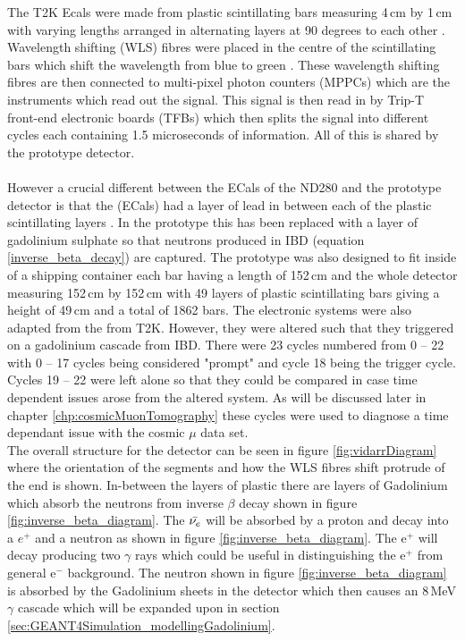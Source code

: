 The T2K Ecals were made from plastic scintillating bars measuring 4\,cm by 1\,cm with varying lengths arranged in alternating layers at 90 degrees to each other \cite{Allan_2013}. Wavelength shifting (WLS) fibres were placed in the centre of the scintillating bars which shift the wavelength from blue to green \cite{Allan_2013}. These wavelength shifting fibres are then connected to multi-pixel photon counters (MPPCs) which are the instruments which read out the signal. This signal is then read in by Trip-T front-end electronic boards (TFBs) which then splits the signal into different cycles each containing 1.5 microseconds of information. All of this is shared by the prototype detector. 
\\\\However a crucial different between the ECals of the ND280 and the prototype detector is that the (ECals) had a layer of lead in between each of the plastic scintillating layers \cite{Allan_2013}. In the prototype this has been replaced with a layer of gadolinium sulphate so that neutrons produced in IBD (equation \ref{inverse_beta_decay}) are captured. The prototype was also designed to fit inside of a shipping container each bar having a length of 152\,cm and the whole detector measuring 152\,cm by 152\,cm with 49 layers of plastic scintillating bars giving a height of 49\,cm and a total of 1862 bars. The electronic systems were also adapted from the from T2K. However, they were altered such that they triggered on a gadolinium cascade from IBD. There were 23 cycles numbered from 0 -- 22 with 0 -- 17 cycles being considered "prompt" and cycle 18 being the trigger cycle. Cycles 19 -- 22 were left alone so that they could be compared in case time dependent issues arose from the altered system. As will be discussed later in chapter \ref{chp:cosmicMuonTomography} these cycles were used to diagnose a time dependant issue with the cosmic $\mu$ data set.
\\The overall structure for the detector can be seen in figure \ref{fig:vidarrDiagram} where the orientation of the segments and how the WLS fibres shift protrude of the end is shown. In-between the layers of plastic there are layers of Gadolinium which absorb the neutrons from inverse $\beta$ decay shown in figure \ref{fig:inverse_beta_diagram}. The $\Bar{\nu_e}$ will be absorbed by a proton and decay into a $e^+$ and a neutron as shown in figure \ref{fig:inverse_beta_diagram}. The e$^+$ will decay producing two $\gamma$ rays which could be useful in distinguishing the e$^+$ from general e$^-$ background. The neutron shown in figure \ref{fig:inverse_beta_diagram} is absorbed by the Gadolinium sheets in the detector which then causes an 8\,MeV $\gamma$ cascade which will be expanded upon in section \ref{sec:GEANT4Simulation_modellingGadolinium}.  

